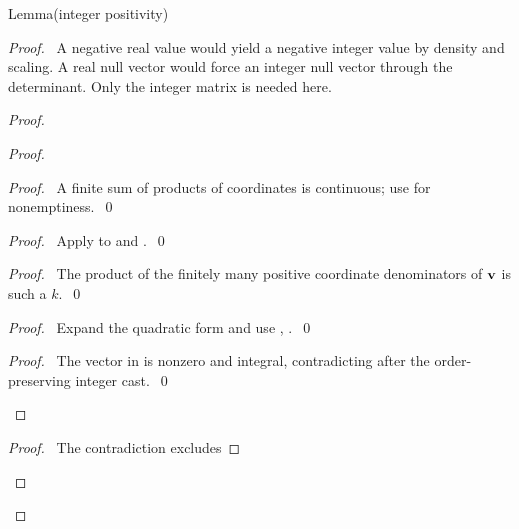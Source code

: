 \begin{namedresult}{Lemma}{(integer positivity)}\label{lem:integer-positive}
\end{namedresult}
\begin{proof}
\pfsketch\ A negative real value would yield a negative integer value
by density and scaling. A real null vector would force an integer null
vector through the determinant. Only the integer matrix is needed here.
\begin{proof}
\begin{proof}
\begin{proof}\pf\ A finite sum of products of coordinates is continuous;
use  for nonemptiness.~\qed\end{proof}
\begin{proof}\pf\ Apply  to
 and .~\qed\end{proof}
\begin{proof}\pf\ The product of the finitely many positive coordinate
denominators of ${\mathbf v}$ is such a $k$.~\qed\end{proof}
\begin{proof}\pf\ Expand the quadratic form and use
, .~\qed\end{proof}
\qedstep
\begin{proof}\pf\ The vector in  is nonzero
and integral, contradicting  after the order-preserving
integer cast.~\qed\end{proof}
\end{proof}
\qedstep
\begin{proof}\pf\ The contradiction  excludes

\end{proof}
\end{proof}
\end{proof}
